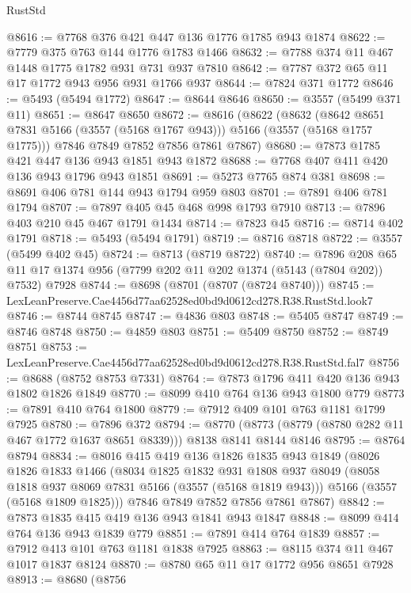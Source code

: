 \begin{lexlean}{RustStd}
\begin{coremodule}
@8616 := @7768 @376 @421 @447 @136 @1776 @1785 @943 @1874
@8622 := @7779 @375 @763 @144 @1776 @1783 @1466
@8632 := @7788 @374 @11 @467 @1448 @1775 @1782 @931 @731 @937 @7810
@8642 := @7787 @372 @65 @11 @17 @1772 @943 @956 @931 @1766 @937
@8644 := @7824 @371 @1772
@8646 := @5493 (@5494 @1772)
@8647 := @8644 @8646
@8650 := @3557 (@5499 @371 @11)
@8651 := @8647 @8650
@8672 := @8616
    (@8622
      (@8632 (@8642 @8651 @7831 @5166 (@3557 (@5168 @1767 @943))) @5166 (@3557 (@5168 @1757 @1775)))
      @7846
      @7849
      @7852
      @7856
      @7861
      @7867)
@8680 := @7873 @1785 @421 @447 @136 @943 @1851 @943 @1872
@8688 := @7768 @407 @411 @420 @136 @943 @1796 @943 @1851
@8691 := @5273 @7765 @874 @381
@8698 := @8691 @406 @781 @144 @943 @1794 @959 @803
@8701 := @7891 @406 @781 @1794
@8707 := @7897 @405 @45 @468 @998 @1793 @7910
@8713 := @7896 @403 @210 @45 @467 @1791 @1434
@8714 := @7823 @45
@8716 := @8714 @402 @1791
@8718 := @5493 (@5494 @1791)
@8719 := @8716 @8718
@8722 := @3557 (@5499 @402 @45)
@8724 := @8713 (@8719 @8722)
@8740 := @7896
    @208
    @65
    @11
    @17
    @1374
    @956
    (@7799 @202 @11 @202 @1374 (@5143 (@7804 @202)) @7532)
    @7928
@8744 := @8698 (@8701 (@8707 (@8724 @8740)))
@8745 := LexLeanPreserve.Cae4456d77aa62528ed0bd9d0612cd278.R38.RustStd.look7
@8746 := @8744 @8745
@8747 := @4836 @803
@8748 := @5405 @8747
@8749 := @8746 @8748
@8750 := @4859 @803
@8751 := @5409 @8750
@8752 := @8749 @8751
@8753 := LexLeanPreserve.Cae4456d77aa62528ed0bd9d0612cd278.R38.RustStd.fal7
@8756 := @8688 (@8752 @8753 @7331)
@8764 := @7873 @1796 @411 @420 @136 @943 @1802 @1826 @1849
@8770 := @8099 @410 @764 @136 @943 @1800 @779
@8773 := @7891 @410 @764 @1800
@8779 := @7912 @409 @101 @763 @1181 @1799 @7925
@8780 := @7896 @372
@8794 := @8770 (@8773 (@8779 (@8780 @282 @11 @467 @1772 @1637 @8651 @8339))) @8138 @8141 @8144 @8146
@8795 := @8764 @8794
@8834 := @8016
    @415
    @419
    @136
    @1826
    @1835
    @943
    @1849
    (@8026
      @1826
      @1833
      @1466
      (@8034
        @1825
        @1832
        @931
        @1808
        @937
        @8049
        (@8058 @1818 @937 @8069 @7831 @5166 (@3557 (@5168 @1819 @943)))
        @5166
        (@3557 (@5168 @1809 @1825)))
      @7846
      @7849
      @7852
      @7856
      @7861
      @7867)
@8842 := @7873 @1835 @415 @419 @136 @943 @1841 @943 @1847
@8848 := @8099 @414 @764 @136 @943 @1839 @779
@8851 := @7891 @414 @764 @1839
@8857 := @7912 @413 @101 @763 @1181 @1838 @7925
@8863 := @8115 @374 @11 @467 @1017 @1837 @8124
@8870 := @8780 @65 @11 @17 @1772 @956 @8651 @7928
@8913 := @8680
    (@8756

\end{coremodule}
\end{lexlean}

